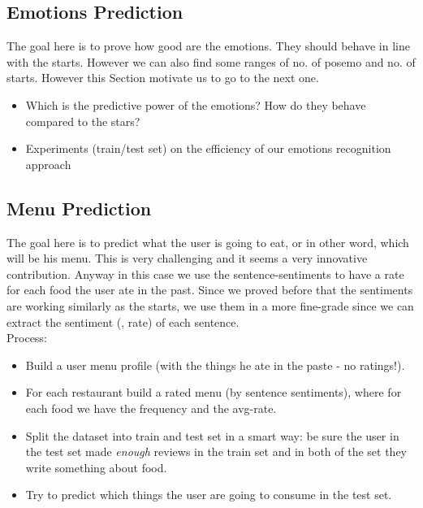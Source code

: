 \subsection*{Emotions Prediction} \label{sec:experiments:emotions} 
The goal here is to prove how good are the emotions. They should behave in line with the starts. However we can also find some ranges of no. of posemo and no. of starts. However this Section motivate us to go to the next one.
\begin{itemize}
\item Which is the predictive power of the emotions? How do they behave compared to the stars?
\item Experiments (train/test set) on the efficiency of our emotions recognition approach
\end{itemize}


\subsection*{Menu Prediction} \label{sec:experiments:menu} 
The goal here is to predict what the user is going to eat, or in other word, which will be his menu. This is very challenging and it seems a very innovative contribution. Anyway in this case we use the sentence-sentiments to have a rate for each food the user ate in the past. Since we proved before that the sentiments are working similarly as the starts, we use them in a more fine-grade since we can extract the sentiment (\ie, rate) of each sentence. \\

Process:
\begin{itemize}
\item Build a user menu profile (with the things he ate in the paste - no ratings!).
\item For each restaurant build a rated menu (by sentence sentiments), where for each food we have the frequency and the avg-rate.
\item Split the dataset into train and test set in a smart way: be sure the user in the test set made \textit{enough} reviews in the train set and in both of the set they write something about food.
\item Try to predict which things the user are going to consume in the test set.
\end{itemize}





